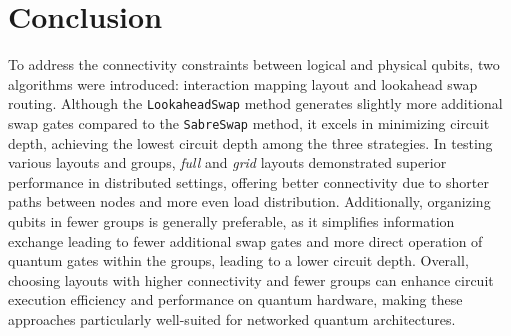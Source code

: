 \chapter{Conclusion} \label{Chap6} %
To address the connectivity constraints between logical and physical qubits, two algorithms were introduced: interaction mapping layout and lookahead swap routing. Although the \lstinline{LookaheadSwap} method generates slightly more additional swap gates compared to the \lstinline{SabreSwap} method, it excels in minimizing circuit depth, achieving the lowest circuit depth among the three strategies. In testing various layouts and groups, \textit{full} and \textit{grid} layouts demonstrated superior performance in distributed settings, offering better connectivity due to shorter paths between nodes and more even load distribution. Additionally, organizing qubits in fewer groups is generally preferable, as it simplifies information exchange leading to fewer additional swap gates and more direct operation of quantum gates within the groups, leading to a lower circuit depth. Overall, choosing layouts with higher connectivity and fewer groups can enhance circuit execution efficiency and performance on quantum hardware, making these approaches particularly well-suited for networked quantum architectures.